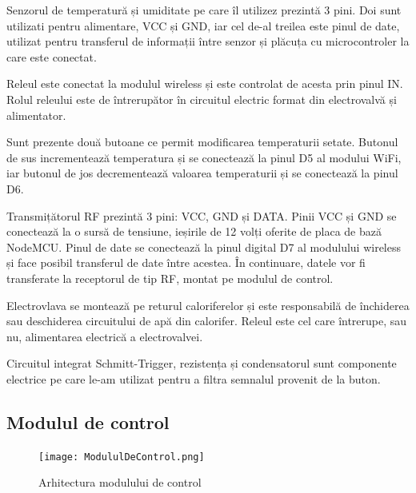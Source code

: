 	Senzorul de temperatură și umiditate pe care îl utilizez prezintă 3 pini. Doi sunt utilizati pentru alimentare, VCC și GND, iar cel de-al treilea este pinul de date, utilizat pentru transferul de informații între senzor și plăcuța cu microcontroler la care este conectat.

\vspace{1em}

	Releul este conectat la modulul wireless și este controlat de acesta prin pinul IN. Rolul releului este de întrerupător în circuitul electric format din electrovalvă și alimentator.

\vspace{1em}

	Sunt prezente două butoane ce permit modificarea temperaturii setate. Butonul de sus incrementează temperatura și se conectează la pinul D5 al modului WiFi, iar butonul de jos decrementează valoarea temperaturii și se conectează la pinul D6.

\vspace{1em}

	Transmițătorul RF prezintă 3 pini: VCC, GND și DATA. Pinii VCC și GND se conectează la o sursă de tensiune, ieșirile de 12 volți oferite de placa de bază NodeMCU. Pinul de date se conectează la pinul digital D7 al modulului wireless și face posibil transferul de date între acestea. În continuare, datele vor fi transferate la receptorul de tip RF, montat pe modulul de control.  

\vspace{1em}

	Electrovlava se montează pe returul caloriferelor și este responsabilă de închiderea sau deschiderea circuitului de apă din calorifer. Releul este cel care întrerupe, sau nu, alimentarea electrică a electrovalvei.

\vspace{1em}

	Circuitul integrat Schmitt-Trigger, rezistența și condensatorul sunt componente electrice pe care le-am utilizat pentru a filtra semnalul provenit de la buton.  

\subsection{Modulul de control}

\begin{figure}[H]
   	\centering
    	\texttt{[image: ModululDeControl.png]}
	\caption{Arhitectura modulului de control}
\end{figure}

